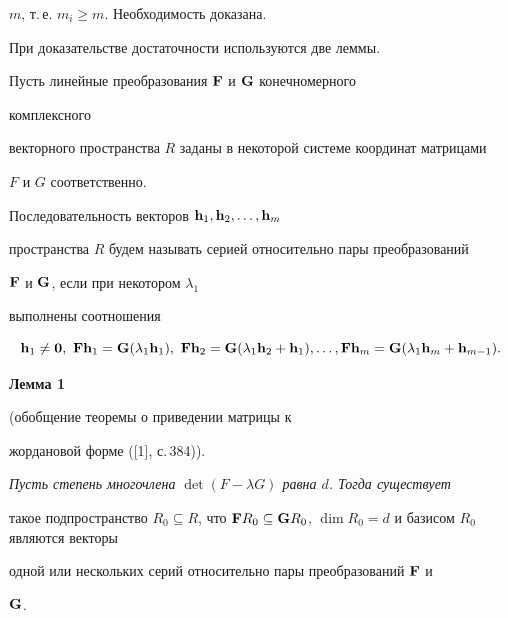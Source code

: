 $m$, т.\,е. $m_i\ge m$. Необходимость доказана. 


 


При доказательстве достаточности используются две леммы. 


 


Пусть линейные преобразования $\bold F$ и $\bold G$ конечномерного 


комплексного 


векторного пространства $R$ заданы в некоторой системе координат матрицами 


$F$ и $G$ соответственно. 


 


Последовательность векторов $\bold h_1,\bold h_2,\dotsc,\bold h_m$ 


пространства $R$ будем называть серией относительно пары преобразований 


$\bold F$ и $\bold G$, если при некотором $\lambda_1$ 


выполнены соотношения 


$$ 


\bold h_1\ne\bold 0,\ \bold F\bold h_1=\bold G(\lambda_1\bold h_1), 


\ \bold F\bold h_2=\bold G(\lambda_1\bold h_2+\bold h_1),\dotsc, 


\bold F\bold h_m=\bold G(\lambda_1\bold h_m+\bold h_{m-1}). 


$$ 


 


{\bf Лемма 1}


(обобщение теоремы о приведении матрицы к 


жордановой форме ([1], с.\,384)).


{\it Пусть степень многочлена $\det(F-\lambda G)$ равна $d$. Тогда существует 


такое подпространство $R_0\subseteq R$, что $\bold F R_0\subseteq\bold G 


R_0$, $\dim R_0=d$ и базисом $R_0$ являются векторы 


одной или нескольких серий относительно пары преобразований $\bold F$ и 


$\bold G$.}


\setcounter{lem}{1}


 


